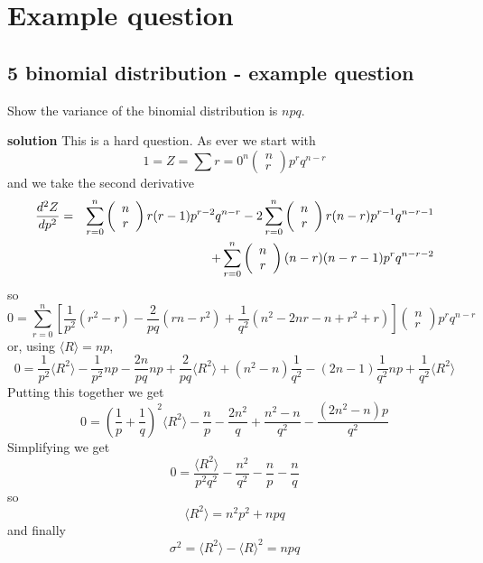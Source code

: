 
\ifind
\section*{Example question}
\else
\subsection*{5 binomial distribution - example question}
\fi
Show the variance of the binomial distribution is $npq$.

\noindent \textbf{solution}
This is a hard question. As ever we start with
\begin{equation}
1=Z=\sum{r=0}^n \left(\begin{array}{c} n\\r\end{array}\right) p^rq^{n-r}
\end{equation}
and we take the second derivative
\begin{eqnarray}
\frac{d^2Z}{dp^2}&=&\sum_{r=0}^n \left(\begin{array}{c} n\\r\end{array}\right) r(r-1)p^{r-2}q^{n-r}-2\sum_{r=0}^n \left(\begin{array}{c} n\\r\end{array}\right) r(n-r)p^{r-1}q^{n-r-1}\cr&&+\sum_{r=0}^n \left(\begin{array}{c} n\\r\end{array}\right)(n-r)(n-r-1) p^rq^{n-r-2}
\end{eqnarray}
so
\begin{equation}
0=\sum_{r=0}^n\left[\frac{1}{p^2}(r^2-r)-\frac{2}{pq}(rn-r^2)+\frac{1}{q^2}(n^2-2nr-n+r^2+r)\right]\left(\begin{array}{c} n\\r\end{array}\right) p^rq^{n-r}
\end{equation}
or, using $\langle R\rangle = np$,
\begin{equation}
0=\frac{1}{p^2}\langle R^2\rangle - \frac{1}{p^2}np-\frac{2n}{pq}np+\frac{2}{pq}\langle R^2\rangle +(n^2-n)\frac{1}{q^2}-(2n-1)\frac{1}{q^2}np+\frac{1}{q^2}\langle R^2\rangle
\end{equation}
Putting this together we get
\begin{equation}
0=\left(\frac{1}{p}+\frac{1}{q}\right)^2\langle R^2\rangle - \frac{n}{p}-\frac{2n^2}{q}+ \frac{n^2-n}{q^2}-\frac{(2n^2-n)p}{q^2}
\end{equation}
Simplifying we get
\begin{equation}
0=\frac{\langle R^2\rangle}{p^2q^2}-\frac{n^2}{q^2}-\frac{n}{p}-\frac{n}{q}
\end{equation}
so
\begin{equation}
\langle R^2\rangle=n^2p^2+npq
\end{equation}
and finally
\begin{equation}
\sigma^2=\langle R^2\rangle-\langle R\rangle^2=npq
\end{equation}



